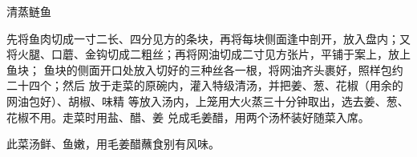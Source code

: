 \begin{recipe}{清蒸鲢鱼}

\ingredients


\preparation

\step 先将鱼肉切成一寸二长、四分见方的条块，再将每块侧面逢中剖开，放入盘内；又
将火腿、口蘑、金钩切成二粗丝；再将网油切成二寸见方张片，平铺于案上，放上鱼块；
鱼块的侧面开口处放入切好的三种丝各一根，将网油齐头裹好，照样包约二十四个；然后
放于走菜的原碗内，灌入特级清汤，并把姜、葱、花椒（用余的网油包好）、胡椒、味精
等放入汤内，上笼用大火蒸三十分钟取出，选去姜、葱、花椒不用。走菜时用盐、醋、姜
兑成毛姜醋，用两个汤杯装好随菜入席。

\features

此菜汤鲜、鱼嫩，用毛姜醋蘸食别有风味。

\end{recipe}

